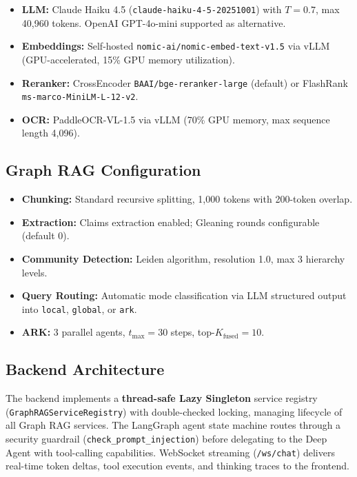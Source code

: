 \documentclass[11pt]{article}
\begin{document}
\begin{itemize}[leftmargin=*]
    \item \textbf{LLM:} Claude Haiku 4.5 (\texttt{claude-haiku-4-5-20251001}) with $T=0.7$, max 40,960 tokens. OpenAI GPT-4o-mini supported as alternative.
    \item \textbf{Embeddings:} Self-hosted \texttt{nomic-ai/nomic-embed-text-v1.5} via vLLM (GPU-accelerated, 15\% GPU memory utilization).
    \item \textbf{Reranker:} CrossEncoder \texttt{BAAI/bge-reranker-large} (default) or FlashRank \texttt{ms-marco-MiniLM-L-12-v2}.
    \item \textbf{OCR:} PaddleOCR-VL-1.5 via vLLM (70\% GPU memory, max sequence length 4,096).
\end{itemize}

\subsection{Graph RAG Configuration}

\begin{itemize}[leftmargin=*]
    \item \textbf{Chunking:} Standard recursive splitting, 1,000 tokens with 200-token overlap.
    \item \textbf{Extraction:} Claims extraction enabled; Gleaning rounds configurable (default 0).
    \item \textbf{Community Detection:} Leiden algorithm, resolution 1.0, max 3 hierarchy levels.
    \item \textbf{Query Routing:} Automatic mode classification via LLM structured output into \texttt{local}, \texttt{global}, or \texttt{ark}.
    \item \textbf{ARK:} 3 parallel agents, $t_{\max} = 30$ steps, top-$K_{\text{fused}} = 10$.
\end{itemize}

\subsection{Backend Architecture}

The backend implements a \textbf{thread-safe Lazy Singleton} service registry (\texttt{GraphRAGServiceRegistry}) with double-checked locking, managing lifecycle of all Graph RAG services. The LangGraph agent state machine routes through a security guardrail (\texttt{check\_prompt\_injection}) before delegating to the Deep Agent with tool-calling capabilities. WebSocket streaming (\texttt{/ws/chat}) delivers real-time token deltas, tool execution events, and thinking traces to the frontend.
\end{document}
